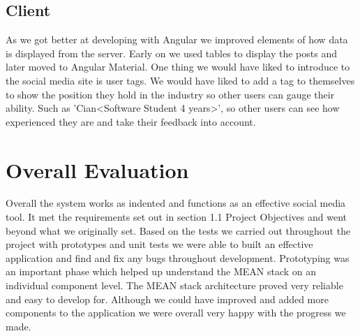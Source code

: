 \subsection{Client}
As we got better at developing with Angular we improved elements of how data is displayed from the server. Early on we used tables to display the posts and later moved to Angular Material. One thing we would have liked to introduce to the social media site is user tags. We would have liked to add a tag to themselves to show the position they hold in the industry so other users can gauge their ability. Such as 'Cian<Software Student 4 years>', so other users can see how experienced they are and take their feedback into account.


\section{Overall Evaluation}
Overall the system works as indented and functions as an effective social media tool. It met the requirements set out in section 1.1 Project Objectives and went beyond what we originally set. Based on the tests we carried out throughout the project with prototypes and unit tests we were able to built an effective application and find and fix any bugs throughout development. Prototyping was an important phase which helped up understand the MEAN stack on an individual component level. The MEAN stack architecture proved very reliable and easy to develop for. Although we could have improved and added more components to the application we were overall very happy with the progress we made.
